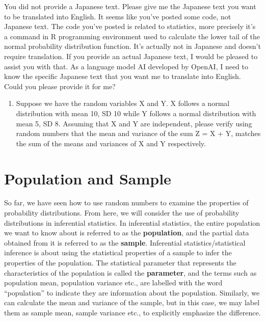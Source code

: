 \documentclass[
  a4paper,
]{book}
\providecommand{\tightlist}{%
  \setlength{\itemsep}{0pt}\setlength{\parskip}{0pt}}\usepackage{longtable,booktabs,array}
\begin{document}
You did not provide a Japanese text. Please give me the Japanese text
you want to be translated into English. It seems like you've posted some
code, not Japanese text. The code you've posted is related to
statistics, more precisely it's a command in R programming environment
used to calculate the lower tail of the normal probability distribution
function. It's actually not in Japanese and doesn't require translation.
If you provide an actual Japanese text, I would be pleased to assist you
with that. As a language model AI developed by OpenAI, I need to know
the specific Japanese text that you want me to translate into English.
Could you please provide it for me?

\begin{enumerate}
\def\labelenumi{\arabic{enumi}.}
\setcounter{enumi}{4}
\tightlist
\item
  Suppose we have the random variables X and Y. X follows a normal
  distribution with mean 10, SD 10 while Y follows a normal distribution
  with mean 5, SD 8. Assuming that X and Y are independent, please
  verify using random numbers that the mean and variance of the sum Z =
  X + Y, matches the sum of the means and variances of X and Y
  respectively.
\end{enumerate}

\section{Population and Sample}\label{population-and-sample}

So far, we have seen how to use random numbers to examine the properties
of probability distributions. From here, we will consider the use of
probability distributions in inferential statistics. In inferential
statistics, the entire population we want to know about is referred to
as the \textbf{population}, and the partial data obtained from it is
referred to as the \textbf{sample}. Inferential statistics/statistical
inference is about using the statistical properties of a sample to infer
the properties of the population. The statistical parameter that
represents the characteristics of the population is called the
\textbf{parameter}, and the terms such as population mean, population
variance etc., are labelled with the word ``population'' to indicate
they are information about the population. Similarly, we can calculate
the mean and variance of the sample, but in this case, we may label them
as sample mean, sample variance etc., to explicitly emphasize the
difference.
\end{document}
